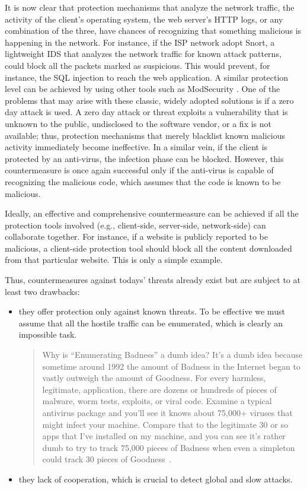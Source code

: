 It is now clear that protection mechanisms that analyze the network
traffic, the activity of the client's operating system, the web
server's \ac{HTTP} logs, or any combination of the three, have chances
of recognizing that something malicious is happening in the
network. For instance, if the \ac{ISP} network adopt \textsf{Snort}, a
lightweight \ac{IDS} that analyzes the network traffic for known
attack patterns, could block all the packets marked as
suspicious. This would prevent, for instance, the \ac{SQL} injection
to reach the web application. A similar protection level can be
achieved by using other tools such as \textsf{ModSecurity}
\citep{ristic:mod_security}. One of the problems that may arise with
these classic, widely adopted solutions is if a zero day
attack is used. A zero day attack or threat exploits a vulnerability
that is unknown to the public, undisclosed to the software vendor, or
a fix is not available; thus, protection mechanisms that merely
blacklist known malicious activity immediately become ineffective. In
a similar vein, if the client is protected by an anti-virus, the
infection phase can be blocked. However, this countermeasure is once
again successful only if the anti-virus is capable of recognizing the
malicious code, which assumes that the code is known to be malicious.

Ideally, an effective and comprehensive countermeasure can be achieved
if all the protection tools involved (e.g., client\hyp{}side,
server\hyp{}side, network\hyp{}side) can collaborate together. For
instance, if a website is publicly reported to be malicious, a
client\hyp{}side protection tool should block all the content
downloaded from that particular website. This is only a simple
example.

Thus, countermeasures against todays' threats already exist but are
subject to at least two drawbacks:

\begin{itemize}
\item they offer protection only against known threats. To be
effective we must assume that all the hostile traffic can be
enumerated, which is clearly an impossible task.

  \begin{quotation}
    Why is ``Enumerating Badness'' a dumb idea? It's a dumb idea
    because sometime around 1992 the amount of Badness in the Internet
    began to vastly outweigh the amount of Goodness. For every
    harmless, legitimate, application, there are dozens or hundreds of
    pieces of malware, worm tests, exploits, or viral code. Examine a
    typical antivirus package and you'll see it knows about 75,000+
    viruses that might infect your machine. Compare that to the
    legitimate 30 or so apps that I've installed on my machine, and
    you can see it's rather dumb to try to track 75,000 pieces of
    Badness when even a simpleton could track 30 pieces of
    Goodness~\citep{ranum-myths}.
  \end{quotation}

\item they lack of cooperation, which is crucial to detect global and
slow attacks.
\end{itemize}

